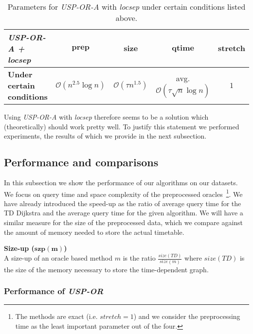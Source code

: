 		\begin{table}[H]
			\centering
			\begin{tabular}{l|c|c|c|c}
				\cellcolor{oracle-clr} \textit{\textbf{USP-OR-A + locsep}} & \cellcolor{oracle-clr} $\bm{prep}$ & \cellcolor{oracle-clr} $\bm{size}$ & \cellcolor{oracle-clr} $\bm{qtime}$ & \cellcolor{oracle-clr} $\bm{stretch}$ \\
				\hline
				\cellcolor{oracle-clr} \textbf{Under certain conditions} & $\mathcal{O}(n^{2.5} \log n)$ & $\mathcal{O}(\tau n^{1.5})$ & avg. $\mathcal{O}(\tau \sqrt{n} \log n)$ & $1$ \\
			\end{tabular}
			\caption{\label{tab:usporalocsep} Parameters for \textit{USP-OR-A} with \textit{locsep} under certain conditions listed above.}
		\end{table}
		
		\noindent Using \textit{USP-OR-A} with \textit{locsep} therefore seems to be a solution which (theoretically) should work pretty well. To justify this statement we performed experiments, the results of which we provide in the next subsection.
	
\subsection{Performance and comparisons}

	\noindent In this subsection we show the performance of our algorithms on our datasets. We focus on query time and space complexity of the preprocessed oracles~\footnote{The methods are exact (i.e. $stretch = 1$) and we consider the preprocessing time as the least important parameter out of the four.}. We have already introduced the speed-up as the ratio of average query time for the TD Dijkstra and the average query time for the given algorithm. We will have a similar measure for the size of the preprocessed data, which we compare against the amount of memory needed to store the actual timetable.
	
	\begin{definition}
		\textbf{Size-up ($\bm{szp(m)}$)}\\
		A size-up of an oracle based method $m$ is the ratio $\frac{\displaystyle size(TD)}{\displaystyle size(m)}$ where $size(TD)$ is the size of the memory necessary to store the time-dependent graph.
	\end{definition}

	\subsubsection{Performance of \textit{USP-OR}}
		
